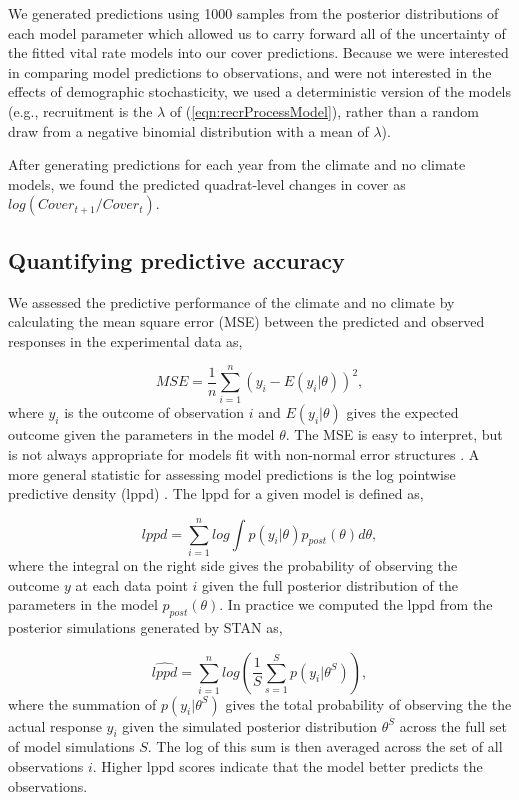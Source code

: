 \documentclass[11pt]{article}
\begin{document}
\begin{doublespacing}
We generated predictions using 1000 samples from the posterior distributions of each model parameter which allowed us to carry forward all of the uncertainty of the fitted vital rate models into our cover predictions. Because we were interested in comparing model predictions to observations, and were not interested in the effects of demographic stochasticity, we used a deterministic version of the models (e.g., recruitment is the $\lambda$ of (\ref{eqn:recrProcessModel}), rather than a random draw from a negative binomial distribution with a mean of $\lambda$).

After generating predictions for each year from the climate and no climate models, we found the predicted quadrat-level changes in cover as $log(Cover_{t+1}/Cover_{t})$.

\subsection*{Quantifying predictive accuracy} 
We assessed the predictive performance of the climate and no climate by calculating the mean square error (MSE) between the predicted and observed responses in the experimental data as, 

\begin{equation}
MSE = \frac{1}{n} \sum_{i=1}^{n} (y_i - E(y_i|\theta))^2, 
\label{eqn:MSE}
\end{equation}
where $y_i$ is the outcome of observation $i$ and $E(y_i|\theta)$ gives the expected outcome given the parameters in the model $\theta$. The MSE is easy to interpret, but is not always appropriate for models fit with non-normal error structures \citep{gelman_understanding_2014}. A more general statistic for assessing model predictions is the log pointwise predictive density (lppd) \citep{gelman_understanding_2014}. The lppd for a given model is defined as, 

\begin{equation}
lppd = \sum_{i=1}^{n} log \int p(y_i| \theta)p_{post}(\theta) d\theta, 
\label{eqn:lppd}
\end{equation}
where the integral on the right side gives the probability of observing the outcome $y$ at each data point $i$ given the full posterior distribution of the parameters in the model $p_{post}(\theta)$. In practice we computed the lppd from the posterior simulations generated by STAN as, 

\begin{equation}
\widehat{lppd} = \sum_{i=1}^{n} log \left(\frac{1}{S} \sum_{s=1}^{S} p(y_i | \theta^S) \right),
\label{eqn:clppd}
\end{equation}
where the summation of $p(y_i|\theta^S)$ gives the total probability of observing the the actual response $y_i$ given the simulated posterior distribution $\theta^S$ across the full set of model simulations $S$.  The log of this sum is then averaged across the set of all observations $i$.  Higher lppd scores indicate that the model better predicts the observations.


\end{doublespacing}
\end{document}
